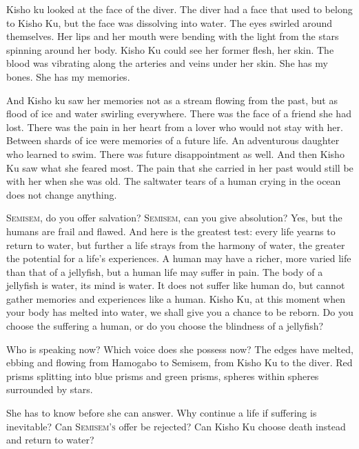 \documentclass[12pt, letterpaper]{report}
\begin{document}
\vspace{1\baselineskip}
Kisho ku looked at the face of the diver. The diver had a face that used to belong to Kisho Ku, but the face was dissolving into water. The  eyes swirled around themselves. Her lips and her mouth were bending with the light from the stars spinning around her body. Kisho Ku could see her former flesh, her skin. The blood was vibrating along the arteries and veins under her skin. She has my bones. She has my memories.

\vspace{1\baselineskip}
And Kisho ku saw her memories not as a stream flowing from the past, but as flood of ice and water swirling everywhere. There was the face of a friend she had lost. There was the pain in her heart from a lover who would not stay with her. Between shards of ice were memories of a future life. An adventurous daughter who learned to swim. There was future disappointment as well. And then Kisho Ku saw what she feared most. The pain that she carried in her past would still be with her when she was old. The saltwater tears of a human crying in the ocean does not change anything.

\vspace{1\baselineskip}
S\textsc{emisem}, do you offer salvation? S\textsc{emisem}, can you give absolution? Yes, but the humans are frail and flawed. And here is the greatest test: every life yearns to return to water, but further a life strays from the harmony of water, the greater the potential for a life's experiences. A human may have a richer, more varied life than that of a jellyfish, but a human life may suffer in pain. The body of a jellyfish is water, its mind is water. It does not suffer like human do, but cannot gather memories and experiences like a human. Kisho Ku, at this moment when your body has melted into water, we shall give you a chance to be reborn. Do you choose the suffering a human, or do you choose the blindness of a jellyfish?

\vspace{1\baselineskip}
Who is speaking now? Which voice does she possess now? The edges have melted, ebbing and flowing from Hamogabo to Semisem, from Kisho Ku to the diver. Red prisms splitting into blue prisms and green prisms, spheres within spheres surrounded by stars.

\vspace{1\baselineskip}
She has to know before she can answer. Why continue a life if suffering is inevitable? Can S\textsc{emisem's} offer be rejected? Can Kisho Ku choose death instead and return to water? 
\end{document}
